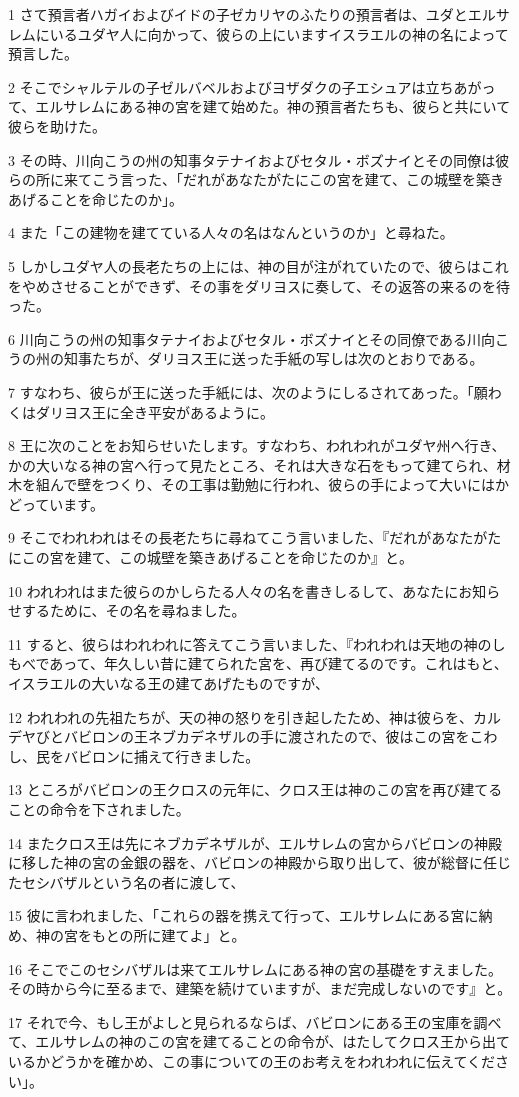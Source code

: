 \par 1 さて預言者ハガイおよびイドの子ゼカリヤのふたりの預言者は、ユダとエルサレムにいるユダヤ人に向かって、彼らの上にいますイスラエルの神の名によって預言した。
\par 2 そこでシャルテルの子ゼルバベルおよびヨザダクの子エシュアは立ちあがって、エルサレムにある神の宮を建て始めた。神の預言者たちも、彼らと共にいて彼らを助けた。
\par 3 その時、川向こうの州の知事タテナイおよびセタル・ボズナイとその同僚は彼らの所に来てこう言った、「だれがあなたがたにこの宮を建て、この城壁を築きあげることを命じたのか」。
\par 4 また「この建物を建てている人々の名はなんというのか」と尋ねた。
\par 5 しかしユダヤ人の長老たちの上には、神の目が注がれていたので、彼らはこれをやめさせることができず、その事をダリヨスに奏して、その返答の来るのを待った。
\par 6 川向こうの州の知事タテナイおよびセタル・ボズナイとその同僚である川向こうの州の知事たちが、ダリヨス王に送った手紙の写しは次のとおりである。
\par 7 すなわち、彼らが王に送った手紙には、次のようにしるされてあった。「願わくはダリヨス王に全き平安があるように。
\par 8 王に次のことをお知らせいたします。すなわち、われわれがユダヤ州へ行き、かの大いなる神の宮へ行って見たところ、それは大きな石をもって建てられ、材木を組んで壁をつくり、その工事は勤勉に行われ、彼らの手によって大いにはかどっています。
\par 9 そこでわれわれはその長老たちに尋ねてこう言いました、『だれがあなたがたにこの宮を建て、この城壁を築きあげることを命じたのか』と。
\par 10 われわれはまた彼らのかしらたる人々の名を書きしるして、あなたにお知らせするために、その名を尋ねました。
\par 11 すると、彼らはわれわれに答えてこう言いました、『われわれは天地の神のしもべであって、年久しい昔に建てられた宮を、再び建てるのです。これはもと、イスラエルの大いなる王の建てあげたものですが、
\par 12 われわれの先祖たちが、天の神の怒りを引き起したため、神は彼らを、カルデヤびとバビロンの王ネブカデネザルの手に渡されたので、彼はこの宮をこわし、民をバビロンに捕えて行きました。
\par 13 ところがバビロンの王クロスの元年に、クロス王は神のこの宮を再び建てることの命令を下されました。
\par 14 またクロス王は先にネブカデネザルが、エルサレムの宮からバビロンの神殿に移した神の宮の金銀の器を、バビロンの神殿から取り出して、彼が総督に任じたセシバザルという名の者に渡して、
\par 15 彼に言われました、「これらの器を携えて行って、エルサレムにある宮に納め、神の宮をもとの所に建てよ」と。
\par 16 そこでこのセシバザルは来てエルサレムにある神の宮の基礎をすえました。その時から今に至るまで、建築を続けていますが、まだ完成しないのです』と。
\par 17 それで今、もし王がよしと見られるならば、バビロンにある王の宝庫を調べて、エルサレムの神のこの宮を建てることの命令が、はたしてクロス王から出ているかどうかを確かめ、この事についての王のお考えをわれわれに伝えてください」。

